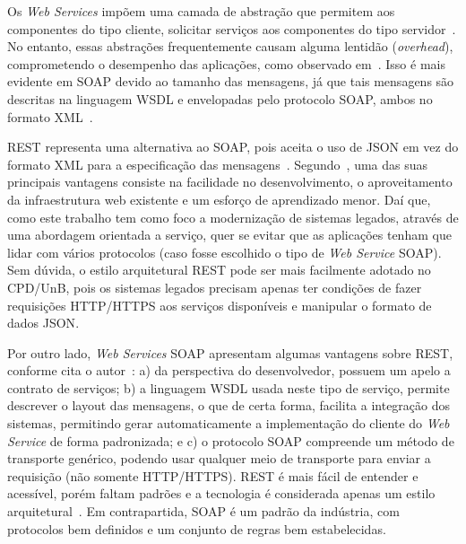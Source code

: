 Os \textit{Web Services} impõem uma camada de abstração que permitem aos componentes do tipo cliente, solicitar serviços aos componentes do tipo servidor~\cite{richardson2008restful}. No entanto, essas abstrações 
frequentemente causam alguma lentidão (\textit{overhead}), comprometendo o desempenho 
das aplicações, como observado em~\cite{fielding2000architectural}. Isso é mais evidente em \acrshort{SOAP} devido ao tamanho das mensagens, já que tais mensagens são descritas na linguagem \acrshort{WSDL} e envelopadas pelo protocolo \acrshort{SOAP}, ambos no formato \acrshort{XML}~\cite{SOAIntBlueprint:2010,richardson2008restful}.

\acrshort{REST} representa uma alternativa ao \acrshort{SOAP}, pois aceita o uso de \acrshort{JSON} em vez do formato \acrshort{XML} para a especificação das mensagens~\cite{fielding2000architectural,kalin2013java}. 
Segundo~\cite{ModelDriApproRest:2014}, uma das suas principais vantagens consiste na facilidade no desenvolvimento, o aproveitamento da infraestrutura web existente e um esforço de aprendizado menor. Daí que, como este trabalho tem como foco a modernização de sistemas legados, através de uma abordagem orientada a serviço, quer se evitar que as aplicações tenham que lidar com vários protocolos (caso fosse escolhido o tipo de \textit{Web Service} \acrshort{SOAP}). Sem dúvida, o estilo arquitetural \acrshort{REST} pode ser mais facilmente adotado no \acrshort{CPD}/\acrshort{UnB}, pois os sistemas legados precisam apenas ter condições de fazer requisições \acrshort{HTTP}/\acrshort{HTTPS} aos serviços disponíveis e manipular o formato de dados \acrshort{JSON}. 

Por outro lado, \textit{Web Services} \acrshort{SOAP} apresentam algumas vantagens sobre \acrshort{REST}, conforme cita o autor~\cite{kalin2013java}: a) da perspectiva do desenvolvedor, possuem um apelo a contrato de serviços; b) a linguagem \acrshort{WSDL} usada neste tipo de serviço, permite descrever o layout das mensagens, o que de certa forma, facilita a integração dos sistemas, permitindo gerar automaticamente a implementação do cliente do \textit{Web Service} de forma padronizada; e c) o protocolo \acrshort{SOAP} compreende um método de transporte genérico, podendo usar qualquer meio de transporte para enviar a requisição (não somente \acrshort{HTTP}/\acrshort{HTTPS}). \acrshort{REST} é mais fácil de entender e acessível, porém faltam padrões e a tecnologia é considerada apenas um estilo arquitetural~\cite{fielding2000architectural}. Em contrapartida, \acrshort{SOAP} é um padrão da indústria, com protocolos bem definidos e um conjunto de regras bem estabelecidas.

